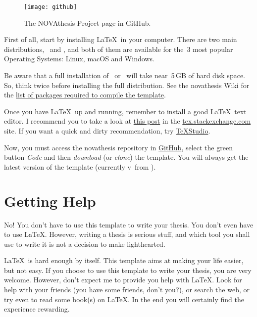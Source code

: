 \begin{figure}
\vspace*{-17ex}
\texttt{[image: github]}%
\caption{The NOVAthesis Project page in GitHub.}
\label{fig:github2}
\end{figure}

First of all, start by installing \LaTeX\ in your computer.  There are two main distributions, \href{https://miktex.org}{\MikTeX}\ and \href{https://www.tug.org/texlive/}{\TeXLive}, and both of them are available for the~3 most popular Operating Systems: Linux, macOS and Windows.

Be aware that a full installation of \MikTeX\ or \TeXLive\ will take near~5\,GB of hard disk space.  So, think twice before installing the full distribution.  See the \gls{novathesis} Wiki for the \href{https://github.com/joaomlourenco/novathesis/wiki/installing-latex#minimal-installation-in-any-of-the-systems-above}{list of packages required to compile the template}.

Once you have \LaTeX\ up and running, remember to install a good \LaTeX\ text editor.  I recommend you to take a look at  \href{https://tex.stackexchange.com/questions/339/latex-editors-ides}{this post} in the \url{tex.stackexchange.com} site.  If you want a quick and dirty recommendation, try \href{https://www.texstudio.org/}{TeXStudio}.

Now, you must access the \gls{novathesis} repository in \href{https://github.com/joaomlourenco/novathesis}{GitHub}, select the green button \emph{Code} and then \emph{download} (or \emph{clone}) the template.  You will always get the latest version of the template (currently v\novathesisversion\ from \novathesisdate).


\section{Getting Help}
\label{sec:getting_help}

No! You don't have to use this template to write your thesis.  You don't even have to use \LaTeX.  However, writing a thesis is serious stuff, and which tool you shall use to write it is not a decision to make lighthearted.

\LaTeX\ is hard enough by itself.  This template aims at making your life easier, but not easy. If you choose to use this template to write your thesis, you are very welcome.  However, don't expect me to provide you help with \LaTeX.  Look for help with your friends (you have some friends, don't you?), or search the web, or try even to read some book(s) on \LaTeX. In the end you will certainly find the experience rewarding.

